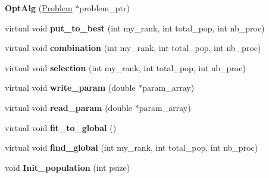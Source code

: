 \begin{DoxyCompactItemize}
\item 
\hypertarget{classOptAlg_abe77a22ec86aaf801f2050de5bdca121}{}{\bfseries Opt\+Alg} (\hyperlink{classProblem}{Problem} $\ast$problem\+\_\+ptr)\label{classOptAlg_abe77a22ec86aaf801f2050de5bdca121}

\item 
\hypertarget{classOptAlg_ac7569e761ec41dcbdad32af72f6a367c}{}virtual void {\bfseries put\+\_\+to\+\_\+best} (int my\+\_\+rank, int total\+\_\+pop, int nb\+\_\+proc)\label{classOptAlg_ac7569e761ec41dcbdad32af72f6a367c}

\item 
\hypertarget{classOptAlg_aa559fe662bf710dcb59fdbdad37d7166}{}virtual void {\bfseries combination} (int my\+\_\+rank, int total\+\_\+pop, int nb\+\_\+proc)\label{classOptAlg_aa559fe662bf710dcb59fdbdad37d7166}

\item 
\hypertarget{classOptAlg_a3badd6d65bfd2b578974fad574c54ce0}{}virtual void {\bfseries selection} (int my\+\_\+rank, int total\+\_\+pop, int nb\+\_\+proc)\label{classOptAlg_a3badd6d65bfd2b578974fad574c54ce0}

\item 
\hypertarget{classOptAlg_a30d9983af0d0eb8125e888e87fd37a99}{}virtual void {\bfseries write\+\_\+param} (double $\ast$param\+\_\+array)\label{classOptAlg_a30d9983af0d0eb8125e888e87fd37a99}

\item 
\hypertarget{classOptAlg_a7c1def4dcd71ac4a9f9b7edf06503557}{}virtual void {\bfseries read\+\_\+param} (double $\ast$param\+\_\+array)\label{classOptAlg_a7c1def4dcd71ac4a9f9b7edf06503557}

\item 
\hypertarget{classOptAlg_af9dd802bb54ddda92d1284ae1f9e03f8}{}virtual void {\bfseries fit\+\_\+to\+\_\+global} ()\label{classOptAlg_af9dd802bb54ddda92d1284ae1f9e03f8}

\item 
\hypertarget{classOptAlg_a5e29a74018889b754985e6e30cf0cd8a}{}virtual void {\bfseries find\+\_\+global} (int my\+\_\+rank, int total\+\_\+pop, int nb\+\_\+proc)\label{classOptAlg_a5e29a74018889b754985e6e30cf0cd8a}

\item 
\hypertarget{classOptAlg_aa41bb2ae61dade0b4a77ce73676b1e9e}{}void {\bfseries Init\+\_\+population} (int psize)\label{classOptAlg_aa41bb2ae61dade0b4a77ce73676b1e9e}


\end{DoxyCompactItemize}
